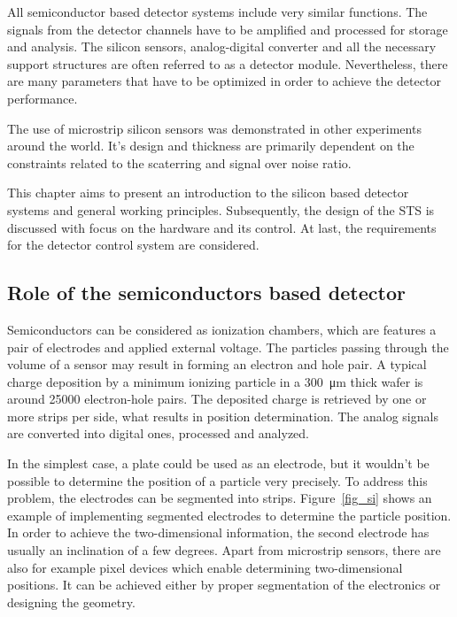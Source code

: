 
All semiconductor based detector systems include very similar functions. The signals from the detector channels have to be amplified and processed for storage and analysis. The silicon sensors, analog-digital converter and all the necessary support structures are often referred to as a detector module. Nevertheless, there are many parameters that have to be optimized in order to achieve the detector performance.

The use of microstrip silicon sensors was demonstrated in other experiments around the world. It's design and thickness are primarily dependent on the constraints related to the scaterring and signal over noise ratio. 

This chapter aims to present an introduction to the silicon based detector systems and general working principles. Subsequently, the design of the \gls{STS} is discussed with focus on the hardware and its control. At last, the requirements for the detector control system are considered. 

\subsection{Role of the semiconductors based detector}

Semiconductors can be considered as ionization chambers, which are features a pair of electrodes and applied external voltage. The particles passing through the volume of a sensor may result in forming an electron and hole pair. A typical charge deposition by a minimum ionizing particle in a \SI{300}{\micro\metre} thick wafer is around 25000 electron-hole pairs. The deposited charge is retrieved by one or more strips per side, what results in position determination. The analog signals are converted into digital ones, processed and analyzed.

In the simplest case, a plate could be used as an electrode, but it wouldn't be possible to determine the position of a particle very precisely. To address this problem, the electrodes can be segmented into strips. Figure~\ref{fig_si} shows an example of implementing segmented electrodes to determine the particle position. In order to achieve the two-dimensional information, the second electrode has usually an inclination of a few degrees. Apart from microstrip sensors, there are also for example pixel devices which enable determining two-dimensional positions. It can be achieved either by proper segmentation of the electronics or designing the geometry.  

